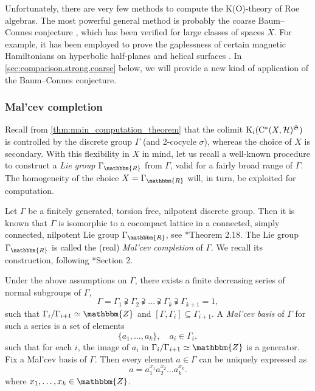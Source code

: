 \documentclass{amsart}
\numberwithin{figure}{section}
\numberwithin{equation}{section}
\numberwithin{table}{section}
\theoremstyle{plain}
\theoremstyle{definition}
\theoremstyle{remark}
\theoremstyle{nonumber}
\newcommand{\Z}{\mathbb{Z}}
\newcommand{\R}{\mathbb{R}}
\newcommand{\K}{\relax\ifmmode\operatorname{K}\else\textup{K}\fi}
\newcommand{\Cst}{\relax\ifmmode\mathrm{C}^*\else\textup{C*}\fi}
\renewcommand{\mathbb}{\mathbbm} %
\begin{document}
Unfortunately, there
are very few methods to compute the K(O)-theory of Roe algebras.  The
most powerful general method is probably the coarse Baum--Connes conjecture
\cite{Higson-Roe:Coarse_Baum-Connes}, which has been verified for large
classes of spaces $X$.  For example, it has been employed to prove the
gaplessness of certain magnetic Hamiltonians on hyperbolic half-planes
\cite{Ludewig-Thiang:Gapless_hyperbolic_half-plane} and helical surfaces
\cite{Kubota-Ludewig-Thiang:Delocalized_helical_surfaces}.  In
\cref{sec:comparison.strong.coarse} below, we will provide a new kind of
application of the Baum--Connes conjecture.

\subsubsection{Mal'cev completion}
\label{sec:Malcev_completion}

Recall from \cref{thm:main_computation_theorem} that the colimit
$\K_i(\Cst(X,\mathcal{H})^\mathfrak{S})$ is controlled by the discrete
group $\Gamma$ (and 2-cocycle $\sigma$), whereas the choice of $X$ is
secondary. With this flexibility in $X$ in mind, let us recall a well-known
procedure to construct a \emph{Lie group} $\Gamma_\R$ from $\Gamma$, valid
for a fairly broad range of $\Gamma$. The homogeneity of the choice
$X=\Gamma_\R$ will, in turn, be exploited for computation.
 
Let \( \Gamma \) be a finitely generated, torsion free, nilpotent discrete
group. Then it is known that \( \Gamma \) is isomorphic to a cocompact lattice
in a connected, simply connected, nilpotent Lie group \( \Gamma_\R \), see
\cite{Raghunathan:Discrete_subgroups_Lie_groups}*{Theorem 2.18}.  The Lie
group \( \Gamma_\R \) is called the (real) \emph{Mal'cev completion} of \(
\Gamma \). We recall its construction, following
\cite{Dekimpe:Intra-nilmanifolds}*{Section 2}.

Under the above assumptions on
$\Gamma$, there exists a finite decreasing series of normal
subgroups of \( \Gamma \),
\[ 
  \Gamma=\Gamma_1\supsetneqq \Gamma_2\supsetneqq \dots\supsetneqq
  \Gamma_k\supsetneqq \Gamma_{k+1}=1,
\]
such that \( \Gamma_i/\Gamma_{i+1}\simeq\Z \) and \(
[\Gamma,\Gamma_{i}]\subseteq \Gamma_{i+1} \). 
A \emph{Mal'cev basis} of \( \Gamma \) for such a series is 
a set of elements
\[ 
  \{a_1,\dots,a_k\},\quad a_i\in \Gamma_i,
\]
such that for each \( i \), 
the image of \( a_i \) in \( \Gamma_i/\Gamma_{i+1}\simeq\Z \) is
a generator. Fix a Mal'cev basis of \( \Gamma \). Then every element \(
a\in\Gamma \) can be uniquely expressed as
\begin{equation}\label{eq:Malcev_basis_expansion}
  a=a_1^{x_1}a_2^{x_2}\dots a_k^{x_k}.
\end{equation}
where \( x_1,\dots,x_k\in\Z \).
\end{document}
